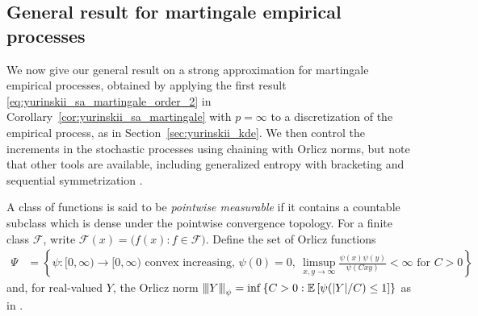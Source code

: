 \documentclass[11pt,lof]{puthesis}
\newcommand{\E}{\ensuremath{\mathbb{E}}}
\newcommand{\cF}{\ensuremath{\mathcal{F}}}
\newcommand{\vvvert}{{\vert\kern-0.25ex\vert\kern-0.25ex\vert}}
\theoremstyle{break}
\theoremstyle{proof}
\begin{document}
\subsection{General result for martingale empirical processes}

We now give our general result on a strong approximation for
martingale empirical processes, obtained by applying
the first result \eqref{eq:yurinskii_sa_martingale_order_2} in
Corollary~\ref{cor:yurinskii_sa_martingale} with $p=\infty$
to a discretization of the empirical process,
as in Section~\ref{sec:yurinskii_kde}.
We then control the increments in the stochastic processes
using chaining with Orlicz norms,
but note that other tools are available,
including generalized entropy with bracketing \citep{geer2000empirical}
and sequential symmetrization \citep{rakhlin2015sequential}.

A class of functions is said to be \emph{pointwise measurable}
if it contains a countable subclass which is dense under
the pointwise convergence topology.
For a finite class $\cF$, write
$\cF(x) = \big(f(x) : f \in \cF\big)$.
Define the set of Orlicz functions
%
\begin{align*}
\Psi
&=
\left\{
\psi: [0, \infty) \to [0, \infty)
\text{ convex increasing, }
\psi(0) = 0,\
\limsup_{x,y \to \infty} \tfrac{\psi(x) \psi(y)}{\psi(C x y)} < \infty
\text{ for } C > 0
\right\}
\end{align*}
%
and, for real-valued $Y$, the Orlicz norm
$\vvvert Y \vvvert_\psi
= \inf
\left\{ C > 0:
\E \left[ \psi(|Y|/C) \leq 1 \right]
\right\}$
as in \citet[Section~2.2]{van1996weak}.
\end{document}
